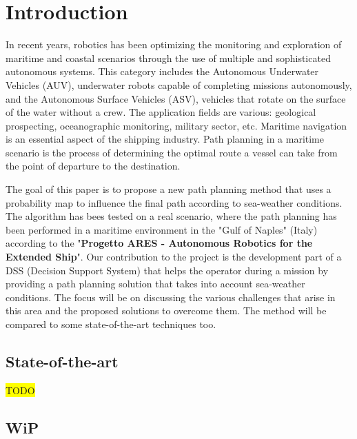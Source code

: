 \documentclass[journal,article,submit,pdftex,moreauthors]{Definitions/mdpi}
\begin{document}

\section{Introduction}
In recent years, robotics has been optimizing the monitoring and exploration of maritime and coastal scenarios through the use of multiple and sophisticated autonomous systems. 
This category includes the Autonomous Underwater Vehicles (AUV), underwater robots capable of completing missions autonomously, and the Autonomous Surface Vehicles (ASV), vehicles that rotate on the surface of the water without a crew. The application fields are various: geological prospecting, oceanographic monitoring, military sector, etc. 
Maritime navigation is an essential aspect of the shipping industry. Path planning in a maritime scenario is the process of determining the optimal route a vessel can take from the point of departure to the destination. 

The goal of this paper is to propose a new path planning method that uses a probability map to influence the final path according to sea-weather conditions.
The algorithm has bees tested on a real scenario, where the path planning has been performed in a maritime environment in the "Gulf of Naples" (Italy) according to 
the "\textbf{Progetto ARES - Autonomous Robotics for the Extended Ship}".
Our contribution to the project is the development part of a DSS (Decision Support System) that helps the operator during a mission by providing a path planning solution 
that takes into account sea-weather conditions.
The focus will be on discussing the various challenges that arise in this area and the proposed solutions to overcome them. 
The method will be compared to some state-of-the-art techniques too.


\subsection{State-of-the-art}
\colorbox{yellow}{TODO}

\subsection{WiP}
\end{document}
